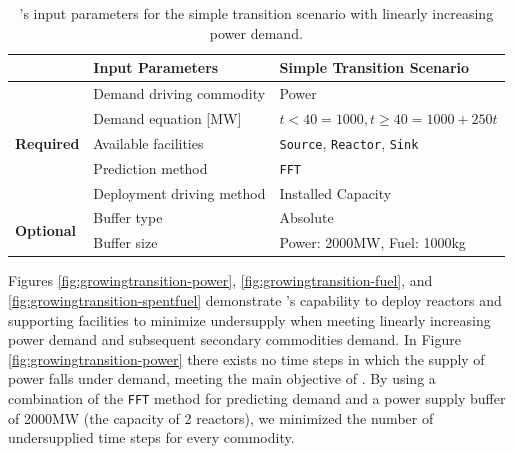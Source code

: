     \begin{table}[]
        \caption{\deploy's input parameters for the simple transition 
        scenario with linearly increasing power demand.}
        \label{tab:demonstrations}
        \begin{tabular}{l|ll}
        \hline
                                  & \textbf{Input Parameters}          & \textbf{Simple Transition Scenario} \\ \hline
        \multirow{5}{*}{\textbf{Required}} & Demand driving commodity  & \multicolumn{1}{l}{Power}                            \\
                                  & Demand equation [MW]          &  $t<40 = 1000, t\geq 40 = 1000+250t$                                                    \\
                                  & Available facilities    &  \texttt{Source}, \texttt{Reactor}, \texttt{Sink}                                                    \\
                                  & Prediction method         &  \texttt{FFT}                                                    \\
                                  & Deployment driving method & \multicolumn{1}{l}{Installed Capacity}               \\ \hline
        \multirow{2}{*}{\textbf{Optional}} & Buffer type               & \multicolumn{1}{l}{Absolute}                         \\
                                  & Buffer size               &  Power: 2000MW, Fuel: 1000kg                                                    \\ \hline
        \end{tabular}%
        \end{table}

Figures \ref{fig:growingtransition-power}, \ref{fig:growingtransition-fuel},
and \ref{fig:growingtransition-spentfuel} demonstrate \deploy's capability 
to deploy reactors and supporting facilities to minimize undersupply 
when meeting linearly increasing power demand and subsequent secondary 
commodities demand. 
In Figure \ref{fig:growingtransition-power} there exists no time steps 
in which the supply of power falls under demand, meeting the main 
objective of \deploy. 
By using a combination of the \texttt{FFT} method for 
predicting demand and a power supply buffer of 2000MW 
(the capacity of 2 reactors), we minimized the number of 
undersupplied time steps for every commodity.

